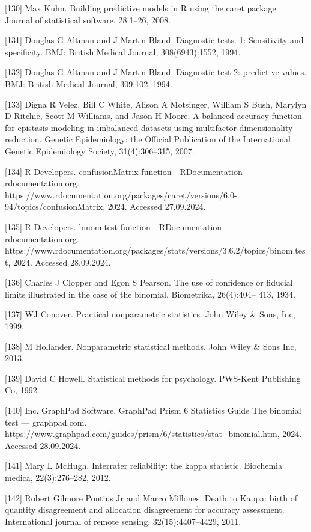 \documentclass[preprint,12pt]{elsarticle}
\begin{document}
[130] Max Kuhn. Building predictive models in R using the caret package. Journal of statistical software, 28:1–26, 2008. 

[131] Douglas G Altman and J Martin Bland. Diagnostic tests. 1: Sensitivity and specificity. BMJ: British Medical Journal, 308(6943):1552, 1994. 

[132] Douglas G Altman and J Martin Bland. Diagnostic test 2: predictive values. BMJ: British Medical Journal, 309:102, 1994. 

[133] Digna R Velez, Bill C White, Alison A Motsinger, William S Bush, Marylyn D Ritchie, Scott M Williams, and Jason H Moore. A balanced accuracy function for epistasis modeling in imbalanced datasets using multifactor dimensionality reduction. Genetic Epidemiology: the Official Publication of the International Genetic Epidemiology Society, 31(4):306–315, 2007. 

[134] R Developers. confusionMatrix function - RDocumentation — rdocumentation.org. https://www.rdocumentation.org/packages/caret/versions/6.0-94/topics/confusionMatrix, 2024. Accessed 27.09.2024. 

[135] R Developers. binom.test function - RDocumentation — rdocumentation.org. https://www.rdocumentation.org/packages/stats/versions/3.6.2/topics/binom.test, 2024. Accessed 28.09.2024. 

[136] Charles J Clopper and Egon S Pearson. The use of confidence or fiducial limits illustrated in the case of the binomial. Biometrika, 26(4):404– 413, 1934. 

[137] WJ Conover. Practical nonparametric statistics. John Wiley & Sons, Inc, 1999. 

[138] M Hollander. Nonparametric statistical methods. John Wiley & Sons Inc, 2013. 

[139] David C Howell. Statistical methods for psychology. PWS-Kent Publishing Co, 1992. 

[140] Inc. GraphPad Software. GraphPad Prism 6 Statistics Guide The binomial test — graphpad.com. https://www.graphpad.com/guides/prism/6/statistics/stat_binomial.htm, 2024. Accessed 28.09.2024. 

[141] Mary L McHugh. Interrater reliability: the kappa statistic. Biochemia medica, 22(3):276–282, 2012. 

[142] Robert Gilmore Pontius Jr and Marco Millones. Death to Kappa: birth of quantity disagreement and allocation disagreement for accuracy assessment. International journal of remote sensing, 32(15):4407–4429, 2011. 
\end{document}

